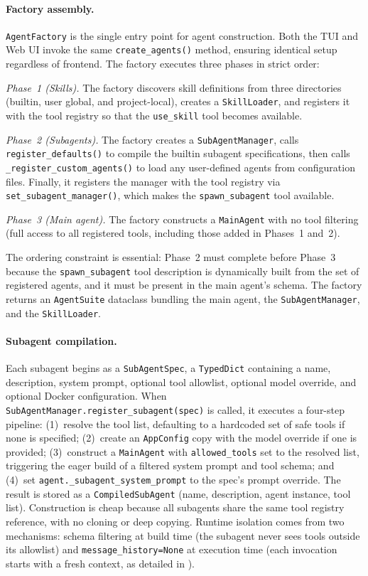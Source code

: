 \paragraph{Factory assembly.}
\texttt{AgentFactory} is the single entry point for agent construction. Both the TUI and Web UI invoke the same \texttt{create\_agents()} method, ensuring identical setup regardless of frontend. The factory executes three phases in strict order:

\emph{Phase~1 (Skills).} The factory discovers skill definitions from three directories (builtin, user global, and project-local), creates a \texttt{SkillLoader}, and registers it with the tool registry so that the \texttt{use\_skill} tool becomes available.

\emph{Phase~2 (Subagents).} The factory creates a \texttt{SubAgentManager}, calls \texttt{register\_defaults()} to compile the builtin subagent specifications, then calls \texttt{\_register\_custom\_agents()} to load any user-defined agents from configuration files. Finally, it registers the manager with the tool registry via \texttt{set\_subagent\_manager()}, which makes the \texttt{spawn\_subagent} tool available.

\emph{Phase~3 (Main agent).} The factory constructs a \texttt{MainAgent} with no tool filtering (full access to all registered tools, including those added in Phases~1 and~2).

The ordering constraint is essential: Phase~2 must complete before Phase~3 because the \texttt{spawn\_subagent} tool description is dynamically built from the set of registered agents, and it must be present in the main agent's schema. The factory returns an \texttt{AgentSuite} dataclass bundling the main agent, the \texttt{SubAgentManager}, and the \texttt{SkillLoader}.

\paragraph{Subagent compilation.}
Each subagent begins as a \texttt{SubAgentSpec}, a \texttt{TypedDict} containing a name, description, system prompt, optional tool allowlist, optional model override, and optional Docker configuration. When \texttt{SubAgentManager.register\_subagent(spec)} is called, it executes a four-step pipeline: (1)~resolve the tool list, defaulting to a hardcoded set of safe tools if none is specified; (2)~create an \texttt{AppConfig} copy with the model override if one is provided; (3)~construct a \texttt{MainAgent} with \texttt{allowed\_tools} set to the resolved list, triggering the eager build of a filtered system prompt and tool schema; and (4)~set \texttt{agent.\_subagent\_system\_prompt} to the spec's prompt override. The result is stored as a \texttt{CompiledSubAgent} (name, description, agent instance, tool list). Construction is cheap because all subagents share the same tool registry reference, with no cloning or deep copying. Runtime isolation comes from two mechanisms: schema filtering at build time (the subagent never sees tools outside its allowlist) and \texttt{message\_history=None} at execution time (each invocation starts with a fresh context, as detailed in ).

